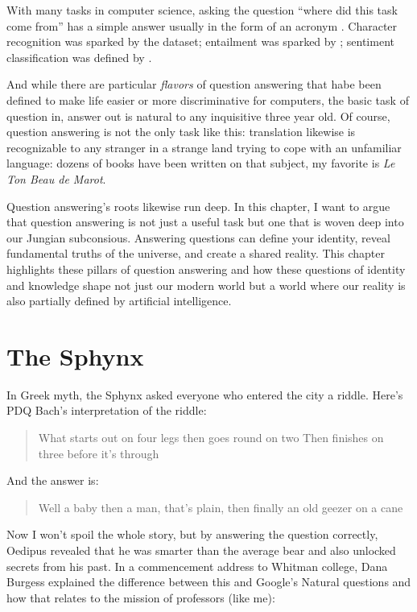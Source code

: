 

With many tasks in computer science, asking the question ``where did this task come from'' has a simple answer usually in the form of an acronym . 
%
Character recognition was sparked by the  dataset; entailment was sparked by ; sentiment classification was defined by \citet{}.

And while there are particular \emph{flavors} of question answering that habe been defined to make life easier or more discriminative for computers, the basic task of question in, answer out is natural to any inquisitive three year old.
%
Of course, question answering is not the only task like this: translation likewise is recognizable to any stranger in a strange land trying to cope with an unfamiliar language: dozens of books have been written on that subject, my favorite is \textit{Le Ton Beau de Marot}.

Question answering's roots likewise run deep.  In this chapter, I want to argue that question answering is not just a useful task but one that is woven deep into our Jungian subconsious.
%
Answering questions can define your identity, reveal fundamental truths of the universe, and create a shared reality.
%
This chapter highlights these pillars of question answering and how these questions of identity and knowledge shape not just our modern world but a world where our reality is also partially defined by artificial intelligence.

\section{The Sphynx}



In Greek myth, the Sphynx asked everyone who entered the city a riddle.  Here’s PDQ Bach’s interpretation of the riddle:
\begin{quote}
What starts out on four legs then goes round on two
Then finishes on three before it’s through
\end{quote}
And the answer is:
\begin{quote}
Well a baby then a man, that’s plain, 
then finally an old geezer on a cane
\end{quote}

Now I won’t spoil the whole story, but by answering the question correctly, Oedipus revealed that he was smarter than the average bear and also unlocked secrets from his past.  In a commencement address to Whitman college, Dana Burgess explained the difference between this and Google’s Natural questions and how that relates to the mission of professors (like me):

